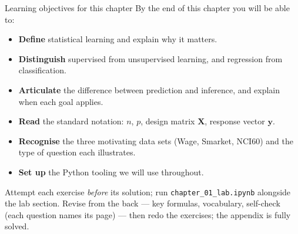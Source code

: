 \documentclass[aspectratio=169,11pt]{beamer}
\begin{document}
\begin{frame}{Learning objectives for this chapter}
  \small
  By the end of this chapter you will be able to:
  \begin{itemize}
    \item \textbf{Define} statistical learning and explain why it
          matters.
    \item \textbf{Distinguish} supervised from unsupervised learning,
          and regression from classification.
    \item \textbf{Articulate} the difference between prediction and
          inference, and explain when each goal applies.
    \item \textbf{Read} the standard notation: $n$, $p$, design
          matrix $\mathbf{X}$, response vector $\mathbf{y}$.
    \item \textbf{Recognise} the three motivating data sets (Wage,
          Smarket, NCI60) and the type of question each illustrates.
    \item \textbf{Set up} the Python tooling we will use throughout.
  \end{itemize}
  \begin{readme}
    \footnotesize Attempt each exercise \emph{before} its solution; run
    \texttt{chapter\_01\_lab.ipynb} alongside the lab section. Revise from the
    back --- key formulas, vocabulary, self-check (each question names its
    page) --- then redo the exercises; the appendix is fully solved.
  \end{readme}
\end{frame}
\end{document}
